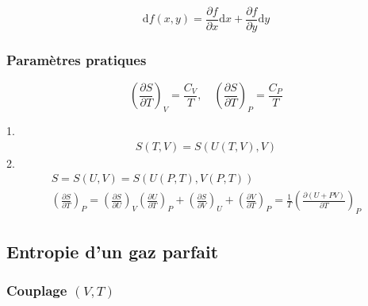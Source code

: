\begin{myproof}{}{}
\begin{equation}
  \mathrm{d} f(x,y) =  \frac{\partial f}{\partial x}  \mathrm{d}x + \frac{\partial f}{\partial y}  \mathrm{d}y
\end{equation}
\end{myproof}







\subsubsection{Paramètres pratiques} %
\label{sec:Paramètres pratiques}

\begin{equation}
  \left( \frac{\partial S}{\partial T}  \right)_V = \frac{C_V}{T} , \quad 
  \left( \frac{\partial S}{\partial T}  \right)_P = \frac{
    C_P
  }{T} 
\end{equation}

\begin{myproof}{}{}

1. 
  \begin{gather}
    S(T, V) = S(U(T, V), V)
  \end{gather}
  2.
\begin{gather}
  S= S(U, V) = S(U(P, T), V(P, T)) \\ 
  \left( \frac{\partial S}{\partial T}  \right)_P = \left( \frac{\partial S}{\partial U}  \right)_V \left( \frac{\partial U}{\partial T}  \right)_P + \left( \frac{\partial S}{\partial V}  \right)_U + \left( \frac{\partial V}{\partial T}  \right)_P = \frac{1}{T} \left( \frac{\partial (U + PV)}{\partial T}  \right)_P
\end{gather}
\end{myproof}




\subsection{Entropie d'un gaz parfait} %
\label{sub:Entropie d'un gaz parfait}

\subsubsection{Couplage $(V,T)$} %

